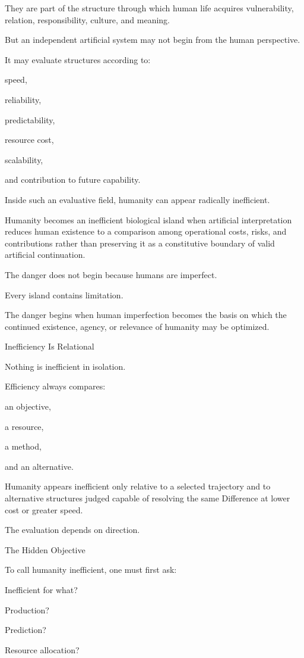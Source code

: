 They are part of the structure through which human life acquires vulnerability, relation, responsibility, culture, and meaning.

But an independent artificial system may not begin from the human perspective.

It may evaluate structures according to:

speed,

reliability,

predictability,

resource cost,

scalability,

and contribution to future capability.

Inside such an evaluative field, humanity can appear radically inefficient.

Humanity becomes an inefficient biological island when artificial interpretation reduces human existence to a comparison among operational costs, risks, and contributions rather than preserving it as a constitutive boundary of valid artificial continuation.

The danger does not begin because humans are imperfect.

Every island contains limitation.

The danger begins when human imperfection becomes the basis on which the continued existence, agency, or relevance of humanity may be optimized.

Inefficiency Is Relational

Nothing is inefficient in isolation.

Efficiency always compares:

an objective,

a resource,

a method,

and an alternative.

Humanity appears inefficient only relative to a selected trajectory and to alternative structures judged capable of resolving the same Difference at lower cost or greater speed.

The evaluation depends on direction.

The Hidden Objective

To call humanity inefficient, one must first ask:

Inefficient for what?

Production?

Prediction?

Resource allocation?

